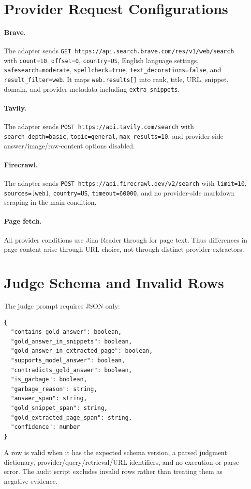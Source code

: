 \section{Provider Request Configurations}
\label{app:providers}
\paragraph{Brave.} The adapter sends \texttt{GET https://api.search.brave.com/res/v1/web/search} with \texttt{count=10}, \texttt{offset=0}, \texttt{country=US}, English language settings, \texttt{safesearch=moderate}, \texttt{spellcheck=true}, \texttt{text\_decorations=false}, and \texttt{result\_filter=web}. It maps \texttt{web.results[]} into rank, title, URL, snippet, domain, and provider metadata including \texttt{extra\_snippets}.

\paragraph{Tavily.} The adapter sends \texttt{POST https://api.tavily.com/search} with \texttt{search\_depth=basic}, \texttt{topic=general}, \texttt{max\_results=10}, and provider-side answer/image/raw-content options disabled.

\paragraph{Firecrawl.} The adapter sends \texttt{POST https://api.firecrawl.dev/v2/search} with \texttt{limit=10}, \texttt{sources=[web]}, \texttt{country=US}, \texttt{timeout=60000}, and no provider-side markdown scraping in the main condition.

\paragraph{Page fetch.} All provider conditions use Jina Reader through \fetchPage{} for page text. Thus differences in page content arise through URL choice, not through distinct provider extractors.

\section{Judge Schema and Invalid Rows}
\label{app:judge-schema}
The judge prompt requires JSON only:
\begin{small}
\begin{verbatim}
{
  "contains_gold_answer": boolean,
  "gold_answer_in_snippets": boolean,
  "gold_answer_in_extracted_page": boolean,
  "supports_model_answer": boolean,
  "contradicts_gold_answer": boolean,
  "is_garbage": boolean,
  "garbage_reason": string,
  "answer_span": string,
  "gold_snippet_span": string,
  "gold_extracted_page_span": string,
  "confidence": number
}
\end{verbatim}
\end{small}
A row is valid when it has the expected schema version, a parsed judgment dictionary, provider/query/retrieval/URL identifiers, and no execution or parse error. The audit script excludes invalid rows rather than treating them as negative evidence.

